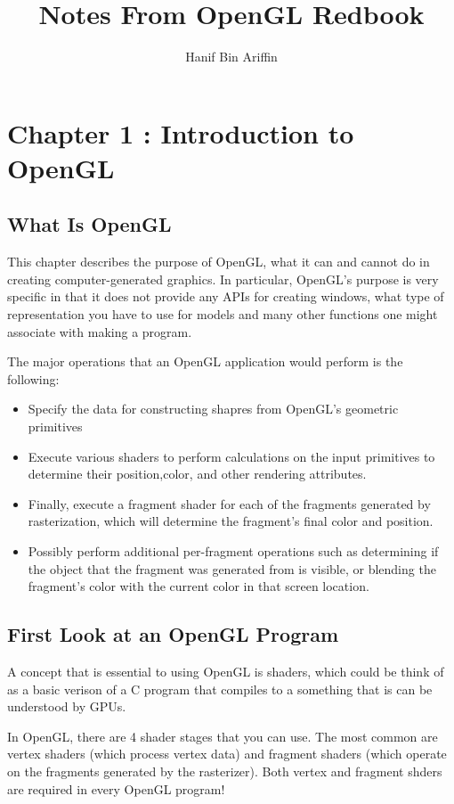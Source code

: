\documentclass[a4paper,10pt]{book}
\title{Notes From OpenGL Redbook}
\author{Hanif Bin Ariffin}
\begin{document}
\maketitle

\section{Chapter 1 : Introduction to OpenGL}

\subsection{What Is OpenGL}

This chapter describes the purpose of OpenGL, what it can and cannot do in creating computer-generated graphics.
In particular, OpenGL's purpose is very specific in that it does not provide any APIs for creating windows, what type of representation you have to use for models and many other functions one might associate with making a program.

The major operations that an OpenGL application would perform is the following:

\begin{itemize}
 \item Specify the data for constructing shapres from OpenGL's geometric primitives
 \item Execute various shaders to perform calculations on the input primitives to determine their position,color, and other rendering attributes.
 \item Finally, execute a fragment shader for each of the fragments generated by rasterization, which will determine the fragment's final color and position.
 \item Possibly perform additional per-fragment operations such as determining if the object that the fragment was generated from is visible, or blending the fragment's color with the current color in that screen location.
\end{itemize}

\subsection{First Look at an OpenGL Program}

A concept that is essential to using OpenGL is shaders, which could be think of as a basic verison of a C program that compiles to a something that is can be understood by GPUs.

In OpenGL, there are 4 shader stages that you can use.
The most common are vertex shaders (which process vertex data) and fragment shaders (which operate on the fragments generated by the rasterizer).
Both vertex and fragment shders are required in every OpenGL program!
\end{document}
